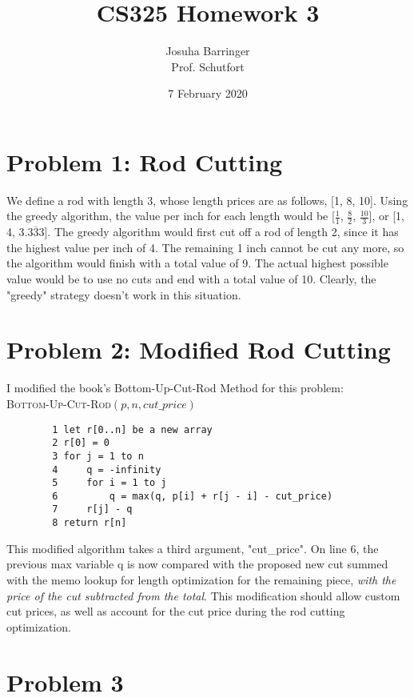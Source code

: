\documentclass{article}
\title{CS325 Homework 3}
\author{Josuha Barringer \\ Prof. Schutfort}
\date{7 February 2020}
\begin{document}
\maketitle

\section*{Problem 1: Rod Cutting}

We define a rod with length 3, whose length prices are as follows, [1, 8, 10].  Using the greedy algorithm, the value per inch for each length would be [$\frac{1}{1}$, $\frac{8}{2}$, $\frac{10}{3}$], or [1, 4, 3.$\overline{333}$].  The greedy algorithm would first cut off a rod of length 2, since it has the highest value per inch of 4.  The remaining 1 inch cannot be cut any more, so the algorithm would finish with a total value of 9.  The actual highest possible value would be to use no cuts and end with a total value of 10.  Clearly, the "greedy" strategy doesn't work in this situation.

\section*{Problem 2: Modified Rod Cutting}

I modified the book's Bottom-Up-Cut-Rod Method for this problem:\\

\textsc{Bottom-Up-Cut-Rod$(p,n,cut\_price)$}

    \begin{verbatim}
        1 let r[0..n] be a new array
        2 r[0] = 0
        3 for j = 1 to n
        4     q = -infinity
        5     for i = 1 to j
        6         q = max(q, p[i] + r[j - i] - cut_price)
        7     r[j] - q
        8 return r[n]
    \end{verbatim}
    
This modified algorithm takes a third argument, "cut\_price".  On line 6, the previous max variable q is now compared with the proposed new cut summed with the memo lookup for length optimization for the remaining piece, \textit{with the price of the cut subtracted from the total}.  This modification should allow custom cut prices, as well as account for the cut price during the rod cutting optimization.

\section*{Problem 3}
\end{document}
